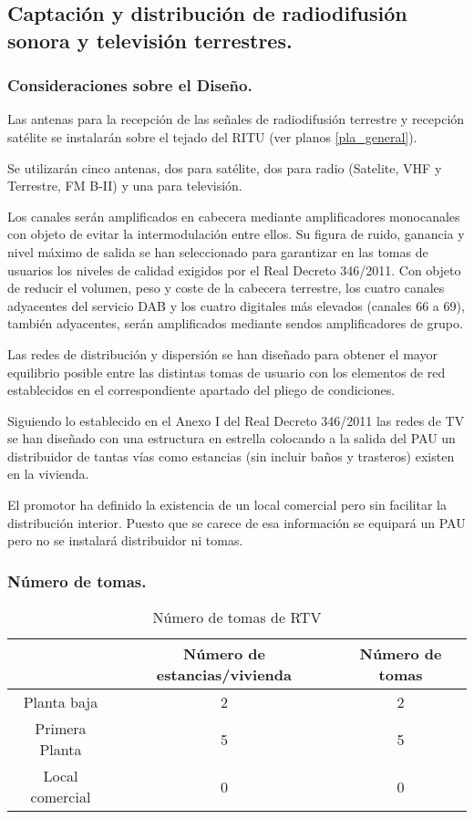 \subsection{Captación y distribución de radiodifusión sonora y televisión terrestres.}

\subsubsection{Consideraciones sobre el Diseño.}


Las antenas para la recepción de las señales de radiodifusión terrestre y recepción satélite se instalarán sobre el tejado del RITU (ver planos \ref{pla_general}).

Se utilizarán cinco antenas, dos para satélite, dos para radio (Satelite, VHF y Terrestre, FM B-II) y una para televisión.

Los canales serán amplificados en cabecera mediante amplificadores monocanales con objeto de evitar la intermodulación entre ellos. Su figura de ruido, ganancia y nivel máximo de salida se han seleccionado para garantizar en las tomas de usuarios los niveles de calidad exigidos por el Real Decreto 346/2011. Con objeto de reducir el volumen, peso y coste de la cabecera terrestre, los
cuatro canales adyacentes del servicio DAB y los cuatro digitales más elevados (canales 66 a 69), también adyacentes, serán amplificados mediante sendos amplificadores de grupo.

Las redes de distribución y dispersión se han diseñado para obtener el mayor equilibrio posible entre las distintas tomas de usuario con los elementos de red establecidos en el correspondiente apartado del pliego de condiciones.

Siguiendo lo establecido en el Anexo I del Real Decreto 346/2011 las redes de TV se han diseñado con una estructura en estrella colocando a la salida del PAU un distribuidor de tantas vías como estancias (sin incluir baños y trasteros) existen en la vivienda.

El promotor ha definido la existencia de un local comercial pero sin facilitar la distribución interior. Puesto que se carece de esa información se equipará un PAU pero no se instalará distribuidor ni tomas.

\subsubsection{Número de tomas.}

\begin{table}[H]
\caption{Número de tomas de RTV}
\label{tomasRTV}
\begin{center}
\begin{tabular}{|c|c|c|}
\hline
	 & Número de estancias/vivienda & Número de tomas\\
\hline \hline
	Planta baja & 2 & 2\\
\hline
	Primera Planta & 5 & 5\\
\hline
    Local comercial & 0 & 0\\
\hline
\end{tabular}
\end{center}
\end{table}


